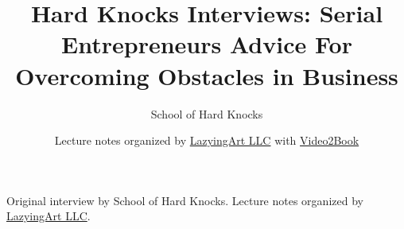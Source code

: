 \documentclass[11pt,oneside]{book}
\begin{document}
\frontmatter
\title{Hard Knocks Interviews: Serial Entrepreneurs Advice For Overcoming Obstacles in Business}
\author{School of Hard Knocks}
\date{Lecture notes organized by \href{https://lazying.art}{LazyingArt LLC} with \href{https://github.com/lachlanchen/Video2Book}{Video2Book}}
\maketitle
\begin{center}
\small Original interview by School of Hard Knocks. Lecture notes organized by \href{https://lazying.art}{LazyingArt LLC}.
\end{center}
\clearpage
\mainmatter

\end{document}
